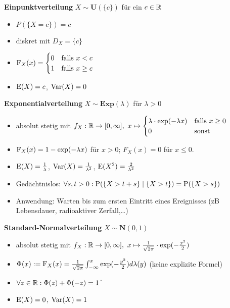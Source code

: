 \textbf{Einpunktverteilung} $X\sim\mathbf{U}(\{c\})$ für ein $c\in\R$
\begin{itemize}
\item $P(\{X=c\})=c$

\item diskret mit $D_X=\{c\}$

\item $\F_X(x)=\begin{cases}
0 	&\text{falls } x<c			\\
1	& \text{falls } x\geq c
\end{cases}$

\item $\E(X)=c$, $\Var(X)=0$
\end{itemize}

\textbf{Exponentialverteilung} $X\sim\mathbf{Exp}(\lambda)$ für $\lambda>0$
\begin{itemize}
\item absolut stetig mit
$f_X:\R\to [0,\infty],\ x\mapsto\begin{cases}
\lambda\cdot\exp(-\lambda x) 	& \text{falls } x\geq 0	\\
0							& \text{sonst }		
\end{cases}$

\item $\F_X(x)=1-\exp(-\lambda x)$ für $x>0$; $F_X(x)=0$ für $x\leq 0.$

\item $\E(X)=\frac{1}{\lambda}$, $\Var(X)=\frac{1}{\lambda^2}$,
$\E(X^2)=\frac{2}{\lambda^2}$

\item Gedächtnislos: $\forall s,t>0:\P(\{X>t+s\}\mid\{X>t\})=\P(\{X>s\})$

\item Anwendung: Warten bis zum ersten Eintritt eines Ereignisses (zB Lebensdauer,
radioaktiver Zerfall,\ldots)
\end{itemize}

\textbf{Standard-Normalverteilung} $X\sim\mathbf{N}(0,1)$
\begin{itemize}
\item absolut stetig mit $f_X:\R\to[0,\infty],\
x\mapsto\frac{1}{\sqrt{2\pi}}\cdot\exp(-\frac{x^2}{2})$

\item $\Phi(x):=\F_X(x)=
\frac{1}{\sqrt{2\pi}}\int_{-\infty}^{x}\exp(-\frac{y^2}{2})d\lambda(y)$
(keine explizite Formel)

\item $\forall z\in\R:\Phi(z)+\Phi(-z)=1$ \U

\item $\E(X)=0$, $\Var(X)=1$

\end{itemize}

